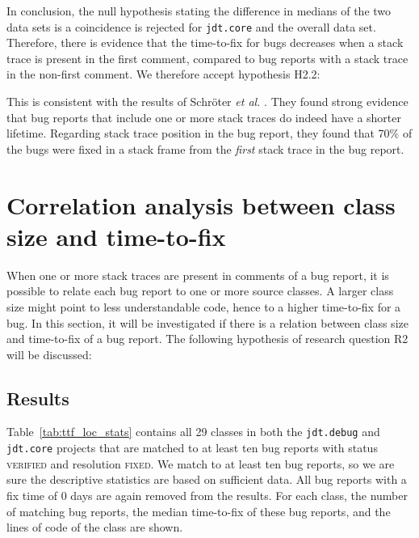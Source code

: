In conclusion, the null hypothesis stating the difference in medians of the two data sets is a coincidence is rejected for \texttt{jdt.core} and the overall data set. Therefore, there is evidence that the time-to-fix for bugs decreases when a stack trace is present in the first comment, compared to bug reports with a stack trace in the non-first comment. We therefore accept hypothesis H2.2:

\vspace{\baselineskip}
\hypbb{}

\noindent
This is consistent with the results of Schr\"{o}ter \emph{et al.} \cite{Schroter2010}. They found strong evidence that bug reports that include one or more stack traces do indeed have a shorter lifetime. Regarding stack trace position in the bug report, they found that 70\% of the bugs were fixed in a stack frame from the \emph{first} stack trace in the bug report.



\section{Correlation analysis between class size and time-to-fix} %
\label{sec:correlation_analysis_between_loc_and_ttf}
When one or more stack traces are present in comments of a bug report, it is possible to relate each bug report to one or more source classes. A larger class size might point to less understandable code, hence to a higher time-to-fix for a bug. In this section, it will be investigated if there is a relation between class size and time-to-fix of a bug report. The following hypothesis of research question R2 will be discussed:

\vspace{\baselineskip}
\hypbc{}

\subsection{Results} %
Table~\ref{tab:ttf_loc_stats} contains all 29 classes in both the \texttt{jdt.debug} and \texttt{jdt.core} projects that are matched to at least ten bug reports with status \textsc{verified} and resolution \textsc{fixed}. We match to at least ten bug reports, so we are sure the descriptive statistics are based on sufficient data. All bug reports with a fix time of 0 days are again removed from the results. For each class, the number of matching bug reports, the median time-to-fix of these bug reports, and the lines of code of the class are shown.

